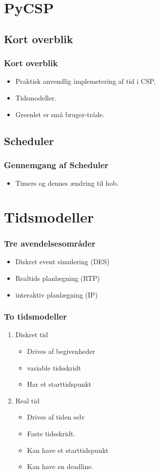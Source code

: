 \documentclass{beamer}
\begin{document}
\section{PyCSP}
\subsection{Kort overblik}
\begin{frame}		
  \frametitle{Kort overblik}
  \begin{itemize}
	\item Praktisk anvendlig implemetering af tid i CSP.
	\item Tidsmodeller.
	\item Greenlet er små bruger-tråde.
  \end{itemize}
\end{frame}

\subsection{Scheduler}
\begin{frame}
  \frametitle{Gennemgang af Scheduler}
  \begin{itemize}
	\item Timers og dennes ændring til hob.
  \end{itemize}
\end{frame}


\section{Tidsmodeller}
\begin{frame}
	\frametitle{Tre avendelsesområder}
	\begin{itemize}
		\item Diskret event simulering (DES)
		\item Realtids planlægning (RTP)
		\item interaktiv planlægning (IP)
	\end{itemize}
\end{frame}

\begin{frame}
	\frametitle{To tidsmodeller}
	\begin{enumerate}
		\item Diskret tid
		\begin{itemize}
			\item Drives af begivenheder
			\item variable tidsskridt
			\item Har et starttidspunkt
 		\end{itemize}
		\item Real tid
		\begin{itemize}
			\item Drives af tiden selv
			\item Faste tidsskridt.
			\item Kan have et starttidspunkt
			\item Kan have en deadline.
		\end{itemize}
	\end{enumerate}
\end{frame}
\end{document}
